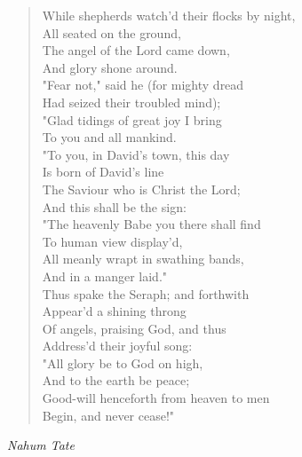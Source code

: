 
\begin{verse}
While shepherds watch'd their flocks by night,\\
\hspace*{2em}All seated on the ground,\\
The angel of the Lord came down,\\
\hspace*{2em}And glory shone around.\\[0.7em]

"Fear not," said he (for mighty dread\\
\hspace*{2em}Had seized their troubled mind);\\
"Glad tidings of great joy I bring\\
\hspace*{2em}To you and all mankind.\\[0.7em]

"To you, in David's town, this day\\
\hspace*{2em}Is born of David's line\\
The Saviour who is Christ the Lord;\\
\hspace*{2em}And this shall be the sign:\\[0.7em]

"The heavenly Babe you there shall find\\
\hspace*{2em}To human view display'd,\\
All meanly wrapt in swathing bands,\\
\hspace*{2em}And in a manger laid."\\[0.7em]

Thus spake the Seraph; and forthwith\\
\hspace*{2em}Appear'd a shining throng\\
Of angels, praising God, and thus\\
\hspace*{2em}Address'd their joyful song:\\[0.7em]

"All glory be to God on high,\\
\hspace*{2em}And to the earth be peace;\\
Good-will henceforth from heaven to men\\
\hspace*{2em}Begin, and never cease!"%
\end{verse}

\vspace{0.5\baselineskip}
\noindent\textit{Nahum Tate}

\newpage
